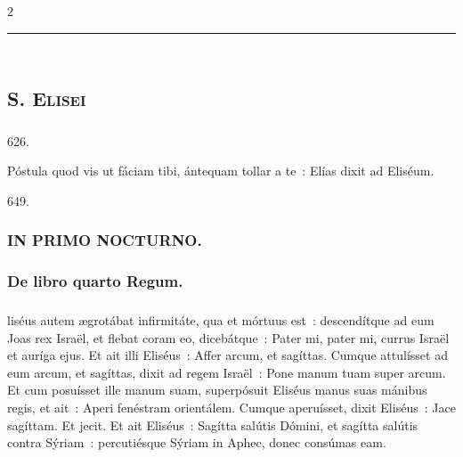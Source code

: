 \documentclass[9pt,twoside]{extarticle}
\begin{document}
\begin{multicols}{2}
\begin{center}\textcolor{red}{\rule{\linewidth}{0.5pt}} \end{center}

\subsection*{\center \textsc{\\
S. Elisei}}
\subsubsection*{\center {}}

\begin{tightlist}{}
\item {} 626. 
\item {} Póstula quod vis ut fáciam tibi, ántequam tollar a te~: Elías dixit ad Eliséum. 
\item {}
\item {} 649.
\end{tightlist}

\subsubsection*{\center \textsc{IN PRIMO NOCTURNO.}}
\subsubsection*{\center De libro quarto Regum.}
\subsubsection*{\center {}}
liséus autem ægrotábat infirmitáte, qua et mórtuus est~: descendítque ad eum Joas rex Israël, et flebat coram eo, dicebátque~: Pater mi, pater mi, currus Israël et auríga ejus.
Et ait illi Eliséus~: Affer arcum, et sagíttas. Cumque attulísset ad eum arcum, et sagíttas,
dixit ad regem Israël~: Pone manum tuam super arcum. Et cum posuísset ille manum suam, superpósuit Eliséus manus suas mánibus regis,
et ait~: Aperi fenéstram orientálem. Cumque aperuísset, dixit Eliséus~: Jace sagíttam. Et jecit. Et ait Eliséus~: Sagítta salútis Dómini, et sagítta salútis contra Sýriam~: percutiésque Sýriam in Aphec, donec consúmas eam.


\end{multicols}
\end{document}
